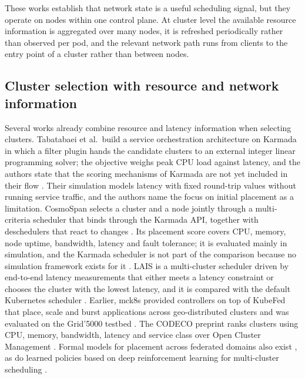 These works establish that network state is a useful scheduling signal, but they operate on nodes within one control plane. At cluster level the available resource information is aggregated over many nodes, it is refreshed periodically rather than observed per pod, and the relevant network path runs from clients to the entry point of a cluster rather than between nodes.

\subsection{Cluster selection with resource and network information}\label{sec:related-cluster}

Several works already combine resource and latency information when selecting clusters. Tabatabaei et al.\ build a service orchestration architecture on Karmada in which a filter plugin hands the candidate clusters to an external integer linear programming solver; the objective weighs peak CPU load against latency, and the authors state that the scoring mechanisms of Karmada are not yet included in their flow \cite{tabatabaei2025cnf}. Their simulation models latency with fixed round-trip values without running service traffic, and the authors name the focus on initial placement as a limitation. CosmoSpan selects a cluster and a node jointly through a multi-criteria scheduler that binds through the Karmada API, together with deschedulers that react to changes \cite{bregar2026cosmospan}. Its placement score covers CPU, memory, node uptime, bandwidth, latency and fault tolerance; it is evaluated mainly in simulation, and the Karmada scheduler is not part of the comparison because no simulation framework exists for it \cite{bregar2026cosmospan}. LAIS is a multi-cluster scheduler driven by end-to-end latency measurements that either meets a latency constraint or chooses the cluster with the lowest latency, and it is compared with the default Kubernetes scheduler \cite{chiaro2024lais}. Earlier, mck8s provided controllers on top of KubeFed that place, scale and burst applications across geo-distributed clusters and was evaluated on the Grid'5000 testbed \cite{tamiru2021mck8s}. The CODECO preprint ranks clusters using CPU, memory, bandwidth, latency and service class over Open Cluster Management \cite{sofia2026codeco}. Formal models for placement across federated domains also exist \cite{faticanti2023locality,khan2025latency}, as do learned policies based on deep reinforcement learning for multi-cluster scheduling \cite{huang2026kmps,jiang2025drkc}.

